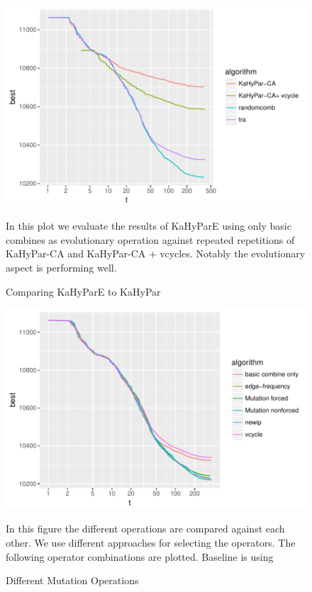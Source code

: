 \documentclass[a4paper,12pt,bibtotoc,titlepage, liststotoc,BCOR7mm,headsepline,pointlessnumbers]{scrbook}
\numberwithin{equation}{section}
\begin{document}
\begin{figure}
\caption{Comparing KaHyParE to KaHyPar}
\begin{center}
\includegraphics{bachelorarbeit-basiccomparation}
\end{center}
In this plot we evaluate the results of KaHyParE using only basic combines as evolutionary operation against repeated repetitions of KaHyPar-CA and KaHyPar-CA + vcycles. Notably the evolutionary aspect is performing well.
\end{figure}








\begin{figure}
\caption{Different Mutation Operations}
\begin{center}
\includegraphics{bachelorarbeit-differentoperatos}
\end{center}
In this figure the different operations are compared against each other. We use different approaches for selecting the operators. The following operator combinations are plotted. Baseline is using 
\end{figure}
\end{document}
